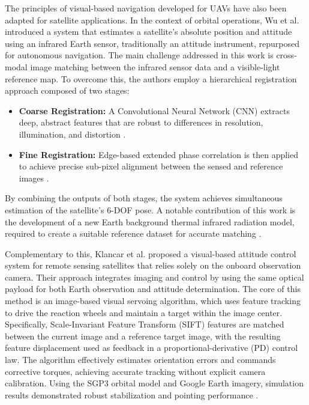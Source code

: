 \noindent
The principles of visual-based navigation developed for UAVs have also been adapted for satellite applications. In the context of orbital operations, Wu et al. \cite{Wu2024} introduced a system that estimates a satellite's absolute position and attitude using an infrared Earth sensor, traditionally an attitude instrument, repurposed for autonomous navigation. The main challenge addressed in this work is cross-modal image matching between the infrared sensor data and a visible-light reference map. To overcome this, the authors employ a hierarchical registration approach composed of two stages:
\begin{itemize}
    \item \textbf{Coarse Registration:} A Convolutional Neural Network (CNN) extracts deep, abstract features that are robust to differences in resolution, illumination, and distortion \cite{Wu2024}.
    \item \textbf{Fine Registration:} Edge-based extended phase correlation is then applied to achieve precise sub-pixel alignment between the sensed and reference images \cite{Wu2024}.
\end{itemize}
By combining the outputs of both stages, the system achieves simultaneous estimation of the satellite's 6-DOF pose. A notable contribution of this work is the development of a new Earth background thermal infrared radiation model, required to create a suitable reference dataset for accurate matching \cite{Wu2024}.
\vspace{0.5cm}

\noindent
Complementary to this, Klancar et al. \cite{Klancar2012} proposed a visual-based attitude control system for remote sensing satellites that relies solely on the onboard observation camera. Their approach integrates imaging and control by using the same optical payload for both Earth observation and attitude determination. The core of this method is an image-based visual servoing algorithm, which uses feature tracking to drive the reaction wheels and maintain a target within the image center. Specifically, Scale-Invariant Feature Transform (SIFT) features are matched between the current image and a reference target image, with the resulting feature displacement used as feedback in a proportional-derivative (PD) control law. The algorithm effectively estimates orientation errors and commands corrective torques, achieving accurate tracking without explicit camera calibration. Using the SGP3 orbital model and Google Earth imagery, simulation results demonstrated robust stabilization and pointing performance \cite{Klancar2012}. 

